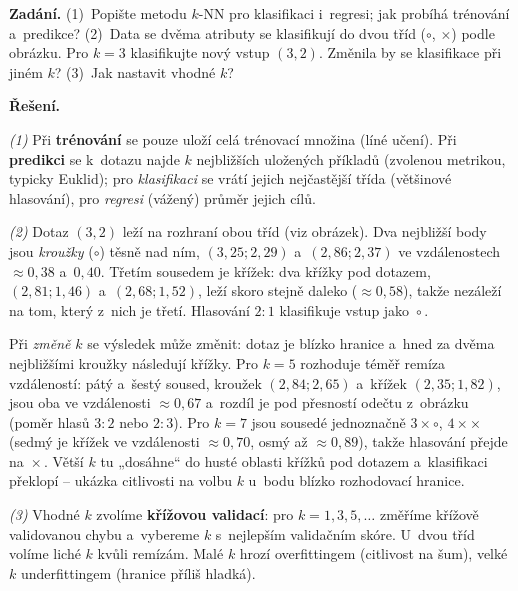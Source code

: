 \begin{priklad}
\par
\textbf{Zadání.} (1)~Popište metodu $k$-NN pro klasifikaci i~regresi; jak probíhá trénování a~predikce? (2)~Data se dvěma atributy se klasifikují do dvou tříd ($\circ$, $\times$) podle obrázku. Pro $k=3$ klasifikujte nový vstup $(3,2)$. Změnila by se klasifikace při jiném $k$? (3)~Jak nastavit vhodné $k$?

\smallskip
\textbf{Řešení.}

\emph{(1)} Při \textbf{trénování} se pouze uloží celá trénovací množina (líné učení). Při \textbf{predikci} se k~dotazu najde $k$ nejbližších uložených příkladů (zvolenou metrikou, typicky Euklid); pro \emph{klasifikaci} se vrátí jejich nejčastější třída (většinové hlasování), pro \emph{regresi} (vážený) průměr jejich cílů.

\emph{(2)} Dotaz $(3,2)$ leží na rozhraní obou tříd (viz obrázek). Dva nejbližší body jsou \emph{kroužky} ($\circ$) těsně nad ním, $(3{,}25;2{,}29)$ a~$(2{,}86;2{,}37)$ ve vzdálenostech $\approx 0{,}38$ a~$0{,}40$. Třetím sousedem je křížek: dva křížky pod dotazem, $(2{,}81;1{,}46)$ a~$(2{,}68;1{,}52)$, leží skoro stejně daleko ($\approx 0{,}58$), takže nezáleží na tom, který z~nich je třetí. Hlasování $2\!:\!1$ klasifikuje vstup jako $\boxed{\circ}$.

Při \emph{změně} $k$ se výsledek může změnit: dotaz je blízko hranice a~hned za dvěma nejbližšími kroužky následují křížky. Pro $k=5$ rozhoduje téměř remíza vzdáleností: pátý a~šestý soused, kroužek $(2{,}84;2{,}65)$ a~křížek $(2{,}35;1{,}82)$, jsou oba ve vzdálenosti $\approx 0{,}67$ a~rozdíl je pod přesností odečtu z~obrázku (poměr hlasů $3\!:\!2$ nebo $2\!:\!3$). Pro $k=7$ jsou sousedé jednoznačně $3\times\circ$, $4\times\times$ (sedmý je křížek ve vzdálenosti $\approx 0{,}70$, osmý až $\approx 0{,}89$), takže hlasování přejde na $\boxed{\times}$. Větší $k$ tu „dosáhne`` do husté oblasti křížků pod dotazem a~klasifikaci překlopí -- ukázka citlivosti na volbu $k$ u~bodu blízko rozhodovací hranice.

\emph{(3)} Vhodné $k$ zvolíme \textbf{křížovou validací}: pro $k=1,3,5,\dots$ změříme křížově validovanou chybu a~vybereme $k$ s~nejlepším validačním skóre. U~dvou tříd volíme liché $k$ kvůli remízám. Malé $k$ hrozí overfittingem (citlivost na šum), velké $k$ underfittingem (hranice příliš hladká).


\end{priklad}
